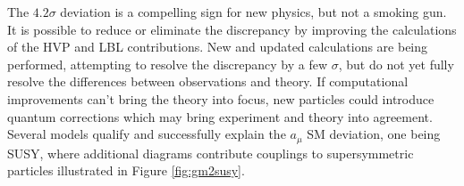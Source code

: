 
The $4.2\sigma$ deviation is a compelling sign for new physics, but not a smoking gun. It is possible to reduce or eliminate the discrepancy by improving the calculations of the HVP and LBL contributions. New and updated calculations are being performed, attempting to resolve the discrepancy by a few $\sigma$, but do not yet fully resolve the differences between observations and theory. If computational improvements can't bring the theory into focus, new particles could introduce  quantum corrections which may bring experiment and theory into agreement. Several models qualify and successfully explain the $a_\mu$ SM deviation, one being SUSY, where additional diagrams contribute couplings to supersymmetric particles illustrated in Figure \ref{fig:gm2susy}.

